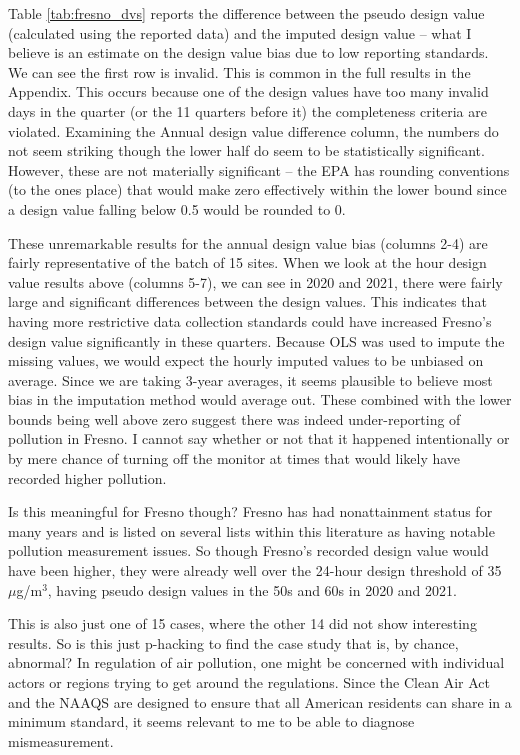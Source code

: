 \documentclass[12pt]{article}
\begin{document}
Table \ref{tab:fresno_dvs} reports the difference between the pseudo design value (calculated using the reported data) and the imputed design value -- what I believe is an estimate on the design value bias due to low reporting standards. We can see the first row is invalid. This is common in the full results in the Appendix. This occurs because one of the design values have too many invalid days in the quarter (or the 11 quarters before it) the completeness criteria are violated. Examining the Annual design value difference column, the numbers do not seem striking though the lower half do seem to be statistically significant. However, these are not materially significant -- the EPA has rounding conventions (to the ones place) that would make zero effectively within the lower bound since a design value falling below 0.5 would be rounded to 0.

These unremarkable results for the annual design value bias (columns 2-4) are fairly representative of the batch of 15 sites. When we look at the hour design value results above (columns 5-7), we can see in 2020 and 2021, there were fairly large and significant differences between the design values. This indicates that having more restrictive data collection standards could have increased Fresno's design value significantly in these quarters. Because OLS was used to impute the missing values, we would expect the hourly imputed values to be unbiased on average. Since we are taking 3-year averages, it seems plausible to believe most bias in the imputation method would average out. These combined with the lower bounds being well above zero suggest there was indeed under-reporting of pollution in Fresno. I cannot say whether or not that it happened intentionally or by mere chance of turning off the monitor at times that would likely have recorded higher pollution.

Is this meaningful for Fresno though? Fresno has had nonattainment status for many years and is listed on several lists within this literature as having notable pollution measurement issues. So though Fresno's recorded design value would have been higher, they were already well over the 24-hour design threshold of 35 $\mu$g/m$^3$, having pseudo design values in the 50s and 60s in 2020 and 2021.

This is also just one of 15 cases, where the other 14 did not show interesting results. So is this just p-hacking to find the case study that is, by chance, abnormal? In regulation of air pollution, one might be concerned with individual actors or regions trying to get around the regulations. Since the Clean Air Act and the NAAQS are designed to ensure that all American residents can share in a minimum standard, it seems relevant to me to be able to diagnose mismeasurement.
\end{document}
